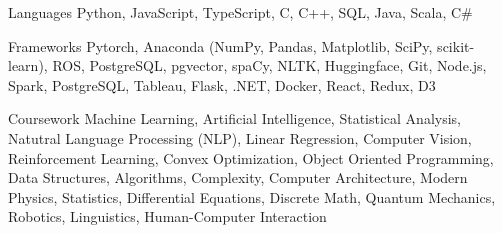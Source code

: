 
\begin{cvskills}
  \cvskill
    {Languages} %
    {Python, JavaScript, TypeScript, C, C++, SQL, Java, Scala, C\#} %

  \cvskill
    {Frameworks} %
    {Pytorch, Anaconda (NumPy, Pandas, Matplotlib, SciPy, scikit-learn), ROS, PostgreSQL, pgvector, spaCy, NLTK, Huggingface, Git, Node.js, Spark, PostgreSQL, Tableau, Flask, .NET, Docker, React, Redux, D3} %

  \cvskill
    {Coursework} %
    {Machine Learning, Artificial Intelligence, Statistical Analysis, Natutral Language Processing (NLP), Linear Regression, Computer Vision, Reinforcement Learning, Convex Optimization, Object Oriented Programming, Data Structures, Algorithms, Complexity, Computer Architecture, Modern Physics, Statistics, Differential Equations, Discrete Math, Quantum Mechanics, Robotics, Linguistics, Human-Computer Interaction}
\end{cvskills}
